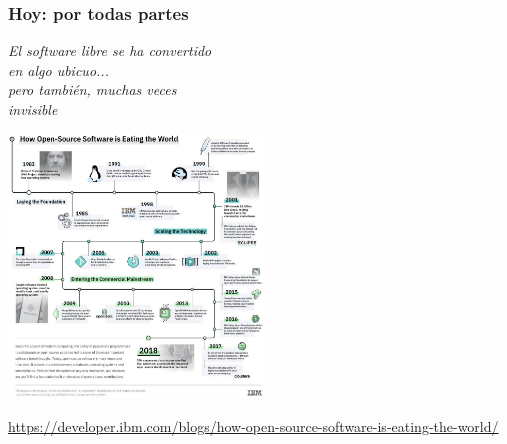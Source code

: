 \documentclass[17pt,aspectratio=169]{beamer}
\begin{document}
\begin{frame}
\frametitle{Hoy: por todas partes}

\begin{center}
  {\em \large
  El software libre se ha convertido \\
  en algo ubicuo... \\
  pero también, muchas veces \\
  invisible \\
  }
\end{center}  

\end{frame}

\begin{frame}

\begin{center}
  \includegraphics[height=7cm]{figs/ibm-opensource-eating-world}
\end{center}  

\begin{flushright}
  {\tiny{\url{https://developer.ibm.com/blogs/how-open-source-software-is-eating-the-world/}}}
\end{flushright}
\end{frame}

\end{document}

